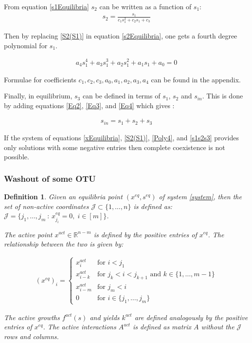 \documentclass[3p,times]{elsarticle}
\newcommand{\R}{\mathbb{R}}
\newtheorem{defn}{Definition}
\begin{document}
From equation \eqref{s1Equilibria} $s_2$ can be written as a function of $s_1$:
\begin{align}
s_2 = \frac{s_1}{c_1s_1^2+c_2s_1+c_3} \label{S2(S1)}
\end{align}


Then by replacing  \eqref{S2(S1)} in equation \eqref{s2Equilibria}, one gets a fourth degree polynomial for $s_1$. 

\begin{align}
\label{Poly4} a_4s_1^4+a_3s_1^3+a_2s_1^2+a_1s_1+a_0 = 0
\end{align}


Formulae for coefficients $c_1, c_2, c_3, a_0, a_1, a_2, a_3, a_4$ can be found in the appendix. 

Finally, in equilibrium, $s_3$ can be defined in terms of $s_1$, $s_2$ and $s_{in}$. This is done by adding equations \eqref{Eq2}, \eqref{Eq3},  and \eqref{Eq4} which gives :

\begin{align}
s_{in} = s_1+s_2+s_3 \label{s1s2s3}
\end{align}

If the system of equations \eqref{xEquilibria}, \eqref{S2(S1)}, \eqref{Poly4}, and \eqref{s1s2s3} provides only solutions with some negative entries then complete coexistence is not possible.

\subsubsection{Washout of some OTU}

\begin{defn}
	Given an equilibria point $(x^{eq},s^{eq})$ of system \eqref{system}, then the set of non-active coordinates $\mathcal{J}\subset \{1,\dots,n\}$ is defined as:
	$\mathcal{J} = \{j_1, \dots, j_m\ : \, x^{eq}_{j_i} = 0 , \;i \in [m] \} $.
	
	The active point $x^{act}\in \R^{n-m}$ is defined by the positive entries of $x^{eq}$. The relationship between the two is given by:
	
	\begin{align}\label{EquilibriaFormula} (x^{eq})_i = \begin{cases}
	x^{act}_i & \text{for } i < j_1\\
	x^{act}_{i-k} & \text{for } j_{k}< i <j_{k+1}  \text{ and } k \in \{1,\dots,m-1\}\\
	x^{act}_{i-m} & \text{for } j_{m}< i \\
	0 & \text{for } i \in \{j_1, \dots, j_m\}
	\end{cases} \end{align}	
	
	The active growths $f^{act}(s)$ and yields $k^{act}$ are defined analogously by the positive entries of $x^{eq}$. The active interactions $A^{act}$ is defined as matrix $A$ without the $\mathcal{J}$ rows and columns.
\end{defn}
\end{document}

